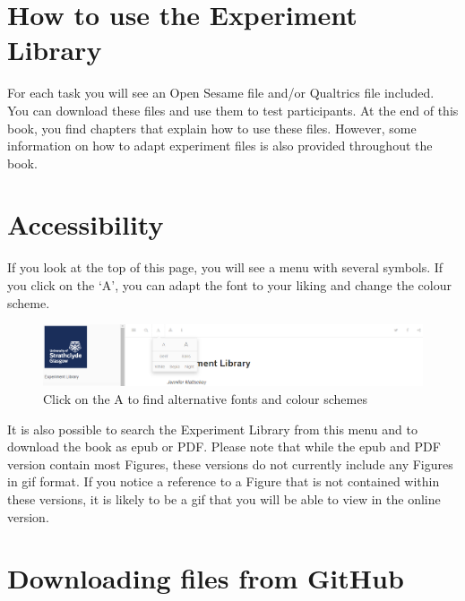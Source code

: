 \documentclass[
]{book}
\begin{document}
\hypertarget{how-to-use-the-experiment-library}{%
\section{How to use the Experiment Library}\label{how-to-use-the-experiment-library}}

For each task you will see an Open Sesame file and/or Qualtrics file included. You can download these files and use them to test participants. At the end of this book, you find chapters that explain how to use these files. However, some information on how to adapt experiment files is also provided throughout the book.

\hypertarget{accessibility}{%
\section{Accessibility}\label{accessibility}}

If you look at the top of this page, you will see a menu with several symbols. If you click on the `A', you can adapt the font to your liking and change the colour scheme.

\begin{figure}

{\centering \includegraphics[width=0.95\linewidth]{images/accessibility} 

}

\caption{Click on the A to find alternative fonts and colour schemes}\label{fig:Figure0-1}
\end{figure}

It is also possible to search the Experiment Library from this menu and to download the book as epub or PDF. Please note that while the epub and PDF version contain most Figures, these versions do not currently include any Figures in gif format. If you notice a reference to a Figure that is not contained within these versions, it is likely to be a gif that you will be able to view in the online version.

\hypertarget{downloading-files-from-github}{%
\section{Downloading files from GitHub}\label{downloading-files-from-github}}
\end{document}
